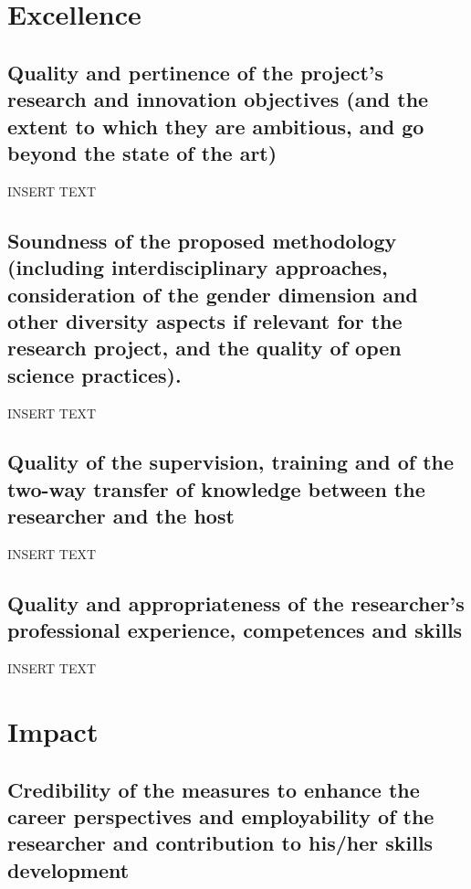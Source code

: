 \documentclass[11pt,a4paper]{article}
\title{}
\author{}
\date{\empty}
\newcommand{\fontSec}{\fontsize{14}{1} \selectfont}
\begin{document}
	
	\section{Excellence }\label{sec:Excellence}

	\subsection{Quality and pertinence of the project’s research and innovation objectives (and the
		extent to which they are ambitious, and go beyond the state of the art)}
	
	INSERT TEXT
	
	
	\subsection{Soundness of the proposed methodology (including interdisciplinary approaches,
		consideration of the gender dimension and other diversity aspects if relevant for the
		research project, and the quality of open science practices).}
	
	INSERT TEXT
	
	\subsection{Quality of the supervision, training and of the two-way transfer of knowledge
		between the researcher and the host}
	
	INSERT TEXT
	
	\subsection{Quality and appropriateness of the researcher’s professional experience,
		competences and skills}
	
	INSERT TEXT
	
	\section{Impact }\label{sec:Impact}
	
	\subsection{Credibility of the measures to enhance the career perspectives and employability of
		the researcher and contribution to his/her skills development}
	
\end{document}
